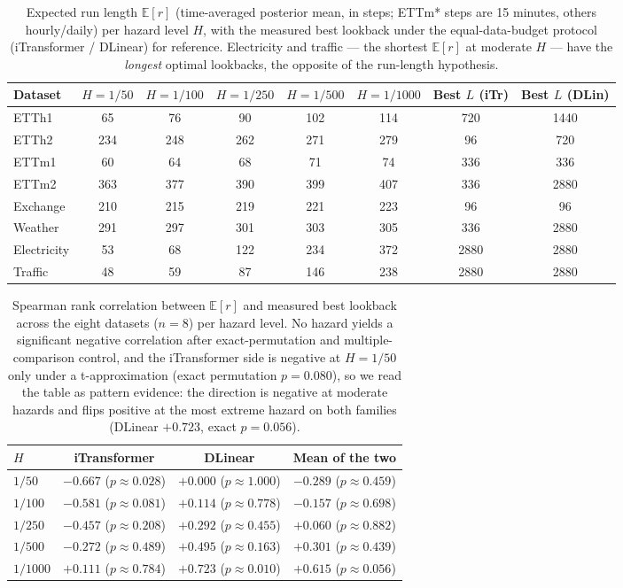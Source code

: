 \begin{table}[t]
\caption{Expected run length $\mathbb{E}[r]$ (time-averaged posterior mean, in steps; ETTm* steps are 15 minutes, others hourly/daily) per hazard level $H$, with the measured best lookback under the equal-data-budget protocol (iTransformer / DLinear) for reference. Electricity and traffic --- the shortest $\mathbb{E}[r]$ at moderate $H$ --- have the \emph{longest} optimal lookbacks, the opposite of the run-length hypothesis.}
\label{tab:bocpd_er}
\centering\small
\begin{tabular}{lccccc cc}
\toprule
Dataset & $H{=}1/50$ & $H{=}1/100$ & $H{=}1/250$ & $H{=}1/500$ & $H{=}1/1000$ & Best $L$ (iTr) & Best $L$ (DLin) \\
\midrule
ETTh1 & 65 & 76 & 90 & 102 & 114 & 720 & 1440 \\
ETTh2 & 234 & 248 & 262 & 271 & 279 & 96 & 720 \\
ETTm1 & 60 & 64 & 68 & 71 & 74 & 336 & 336 \\
ETTm2 & 363 & 377 & 390 & 399 & 407 & 336 & 2880 \\
Exchange & 210 & 215 & 219 & 221 & 223 & 96 & 96 \\
Weather & 291 & 297 & 301 & 303 & 305 & 336 & 2880 \\
Electricity & 53 & 68 & 122 & 234 & 372 & 2880 & 2880 \\
Traffic & 48 & 59 & 87 & 146 & 238 & 2880 & 2880 \\
\bottomrule
\end{tabular}
\end{table}

\begin{table}[t]
\caption{Spearman rank correlation between $\mathbb{E}[r]$ and measured best lookback across the eight datasets ($n{=}8$) per hazard level. No hazard yields a significant negative correlation after exact-permutation and multiple-comparison control, and the iTransformer side is negative at $H{=}1/50$ only under a t-approximation (exact permutation $p=0.080$), so we read the table as pattern evidence: the direction is negative at moderate hazards and flips positive at the most extreme hazard on both families (DLinear $+0.723$, exact $p=0.056$).}
\label{tab:bocpd_spearman}
\centering\small
\begin{tabular}{lccc}
\toprule
$H$ & iTransformer & DLinear & Mean of the two \\
\midrule
$1/50$ & $-0.667$ ($p{\approx}0.028$) & $+0.000$ ($p{\approx}1.000$) & $-0.289$ ($p{\approx}0.459$) \\
$1/100$ & $-0.581$ ($p{\approx}0.081$) & $+0.114$ ($p{\approx}0.778$) & $-0.157$ ($p{\approx}0.698$) \\
$1/250$ & $-0.457$ ($p{\approx}0.208$) & $+0.292$ ($p{\approx}0.455$) & $+0.060$ ($p{\approx}0.882$) \\
$1/500$ & $-0.272$ ($p{\approx}0.489$) & $+0.495$ ($p{\approx}0.163$) & $+0.301$ ($p{\approx}0.439$) \\
$1/1000$ & $+0.111$ ($p{\approx}0.784$) & $+0.723$ ($p{\approx}0.010$) & $+0.615$ ($p{\approx}0.056$) \\
\bottomrule
\end{tabular}
\end{table}

